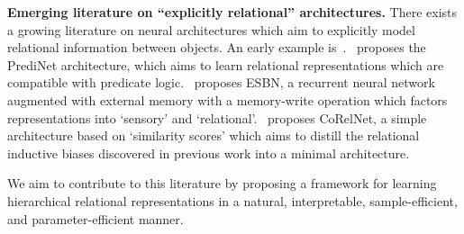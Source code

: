 \textbf{Emerging literature on ``explicitly relational'' architectures.} There exists a growing literature on neural architectures which aim to explicitly model relational information between objects. An early example is~\citep{santoroSimpleNeural2017}.~\citet{shanahanExplicitlyRelationalNeural} proposes the PrediNet architecture, which aims to learn relational representations which are compatible with predicate logic.~\citet{webbEmergentSymbols2021} proposes ESBN, a recurrent neural network augmented with external memory with a memory-write operation which factors representations into `sensory' and `relational'.~\citet{kergNeuralArchitecture2022} proposes CoRelNet, a simple architecture based on `similarity scores' which aims to distill the relational inductive biases discovered in previous work into a minimal architecture. %

We aim to contribute to this literature by proposing a framework for learning hierarchical relational representations in a natural, interpretable, sample-efficient, and parameter-efficient manner.
